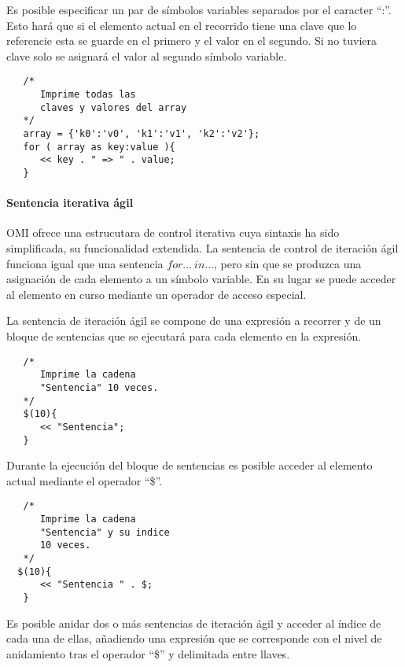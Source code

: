 Es posible especificar un par de símbolos variables separados por el caracter ``:''. Esto hará que si el elemento actual en el recorrido tiene una clave que lo referencie esta se guarde en 
el primero y el valor en el segundo. Si no tuviera clave solo se asignará el valor al segundo símbolo variable. \\


\begin{lstlisting}
   /*
      Imprime todas las 
      claves y valores del array
   */
   array = {'k0':'v0', 'k1':'v1', 'k2':'v2'};
   for ( array as key:value ){
      << key . " => " . value; 
   }
\end{lstlisting}

\paragraph{Sentencia iterativa ágil} \label{sec:stmt_agil}

OMI ofrece una estrucutara de control iterativa cuya sintaxis ha sido simplificada, su funcionalidad extendida. La sentencia de control de iteración ágil funciona
igual que una sentencia $for...\ in...$, pero sin que se produzca una asignación de cada elemento a un símbolo variable. En su lugar se puede acceder al elemento 
en curso mediante un operador de acceso especial.

La sentencia de iteración ágil se compone de una expresión a recorrer y de un bloque de sentencias que se ejecutará para cada elemento en la expresión. \\

\begin{lstlisting}
   /*
      Imprime la cadena 
      "Sentencia" 10 veces.
   */
   $(10){
      << "Sentencia"; 
   }
\end{lstlisting}

Durante la ejecución del bloque de sentencias es posible acceder al elemento actual mediante el operador ``\$''. \\

\begin{lstlisting}
   /*
      Imprime la cadena 
      "Sentencia" y su indice 
      10 veces.
   */
  $(10){
      << "Sentencia " . $; 
   }
\end{lstlisting}

Es posible anidar dos o más sentencias de iteración ágil y acceder al índice de cada una de ellas, añadiendo una expresión que se corresponde con el nivel de
anidamiento tras el operador ``\$'' y delimitada entre llaves. \\


